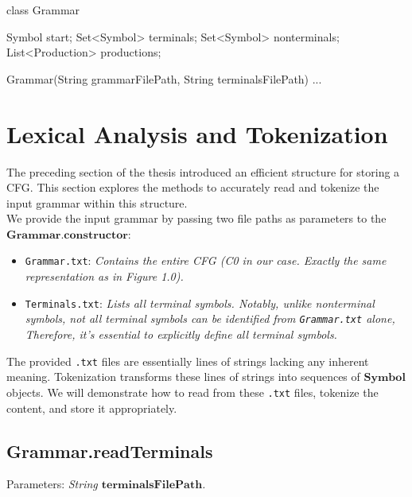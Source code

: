 \begin{codeblock}
    class Grammar {
        Symbol start;
        Set<Symbol> terminals;
        Set<Symbol> nonterminals;
        List<Production> productions;

        Grammar(String grammarFilePath, String terminalsFilePath) {}
        ...
    }
\end{codeblock}

\newpage


\section{Lexical Analysis and Tokenization}\label{sec:Lexical Analysis and Tokenization}

The preceding section of the thesis introduced an efficient structure for storing a CFG. This section explores the methods to accurately read and tokenize the input grammar within this structure.\\

We provide the input grammar by passing two file paths as parameters to the \(\boldsymbol{Grammar.constructor}\):
\begin{itemize}
    \item  \texttt{Grammar.txt}: \textit{Contains the entire CFG (C0 in our case. Exactly the same representation as in Figure 1.0).}
    \item  \texttt{Terminals.txt}: \textit{Lists all terminal symbols. Notably, unlike nonterminal symbols, not all terminal symbols can be identified from \texttt{Grammar.txt} alone, Therefore, it’s essential to explicitly define all terminal symbols.}
\end{itemize}

The provided \texttt{.txt} files are essentially lines of strings lacking any inherent meaning. Tokenization transforms these lines of strings into sequences of \(\boldsymbol{Symbol}\) objects. We will demonstrate how to read from these \texttt{.txt} files, tokenize the content, and store it appropriately.

\subsection{Grammar.readTerminals}

Parameters: \textit{String \(\boldsymbol{terminalsFilePath}\).}

